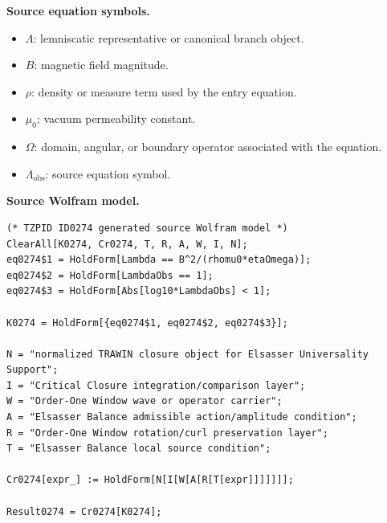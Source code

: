\begin{minipage}[t]{0.49\linewidth}
\begingroup
\small
\raggedright
\textbf{Source equation symbols.}\par
\begin{itemize}[leftmargin=1.35em,itemsep=1pt,topsep=1pt,parsep=0pt]
    \item $\Lambda$: lemniscatic representative or canonical branch object.
    \item $B$: magnetic field magnitude.
    \item $\rho$: density or measure term used by the entry equation.
    \item $\mu_0$: vacuum permeability constant.
    \item $\Omega$: domain, angular, or boundary operator associated with the equation.
    \item $\Lambda_{\mathrm{obs}}$: source equation symbol.
\end{itemize}
\endgroup
\end{minipage}\hfill
\begin{minipage}[t]{0.47\linewidth}
\begingroup
\scriptsize
\raggedright
\textbf{Source Wolfram model.}\par
\begin{Verbatim}[fontsize=\tiny,breaklines=true,breakanywhere=true]
(* TZPID ID0274 generated source Wolfram model *)
ClearAll[K0274, Cr0274, T, R, A, W, I, N];
eq0274$1 = HoldForm[Lambda == B^2/(rhomu0*etaOmega)];
eq0274$2 = HoldForm[LambdaObs == 1];
eq0274$3 = HoldForm[Abs[log10*LambdaObs] < 1];

K0274 = HoldForm[{eq0274$1, eq0274$2, eq0274$3}];

N = "normalized TRAWIN closure object for Elsasser Universality Support";
I = "Critical Closure integration/comparison layer";
W = "Order-One Window wave or operator carrier";
A = "Elsasser Balance admissible action/amplitude condition";
R = "Order-One Window rotation/curl preservation layer";
T = "Elsasser Balance local source condition";

Cr0274[expr_] := HoldForm[N[I[W[A[R[T[expr]]]]]]];

Result0274 = Cr0274[K0274];
\end{Verbatim}
\endgroup
\end{minipage}

